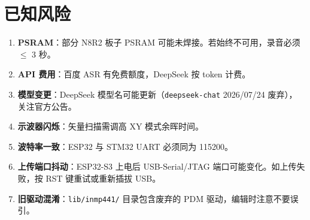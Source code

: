 \documentclass[12pt,a4paper,openany]{ctexbook}
\begin{document}
\section{已知风险}

\begin{enumerate}[leftmargin=2em]
    \item \textbf{PSRAM}：部分 N8R2 板子 PSRAM 可能未焊接。若始终不可用，录音必须 $\le$ 3 秒。
    \item \textbf{API 费用}：百度 ASR 有免费额度，DeepSeek 按 token 计费。
    \item \textbf{模型变更}：DeepSeek 模型名可能更新（\texttt{deepseek-chat} 2026/07/24 废弃），关注官方公告。
    \item \textbf{示波器闪烁}：矢量扫描需调高 XY 模式余晖时间。
    \item \textbf{波特率一致}：ESP32 与 STM32 UART 必须同为 115200。
    \item \textbf{上传端口抖动}：ESP32-S3 上电后 USB-Serial/JTAG 端口可能变化。如上传失败，按 RST 键重试或重新插拔 USB。
    \item \textbf{旧驱动混淆}：\texttt{lib/inmp441/} 目录包含废弃的 PDM 驱动，编辑时注意不要误引。
\end{enumerate}
\end{document}
